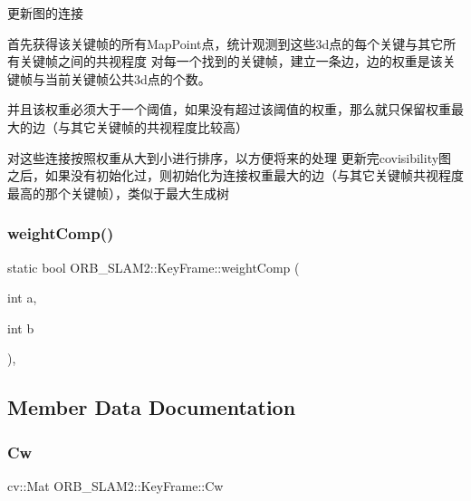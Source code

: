 更新图的连接 


\begin{DoxyEnumerate}
\item 首先获得该关键帧的所有\+Map\+Point点，统计观测到这些3d点的每个关键与其它所有关键帧之间的共视程度 对每一个找到的关键帧，建立一条边，边的权重是该关键帧与当前关键帧公共3d点的个数。
\item 并且该权重必须大于一个阈值，如果没有超过该阈值的权重，那么就只保留权重最大的边（与其它关键帧的共视程度比较高）
\item 对这些连接按照权重从大到小进行排序，以方便将来的处理 更新完covisibility图之后，如果没有初始化过，则初始化为连接权重最大的边（与其它关键帧共视程度最高的那个关键帧），类似于最大生成树 
\end{DoxyEnumerate}\mbox{\label{class_o_r_b___s_l_a_m2_1_1_key_frame_ad2d0287d1ca4a91cd9d684754c84a08b}} 
\subsubsection{\texorpdfstring{weight\+Comp()}{weightComp()}}
{\footnotesize\ttfamily static bool O\+R\+B\+\_\+\+S\+L\+A\+M2\+::\+Key\+Frame\+::weight\+Comp (\begin{DoxyParamCaption}\item[{int}]{a,  }\item[{int}]{b }\end{DoxyParamCaption})\hspace{0.3cm}{\ttfamily [inline]}, {\ttfamily [static]}}



\subsection{Member Data Documentation}
\mbox{\label{class_o_r_b___s_l_a_m2_1_1_key_frame_a4666bde848e4fbabf327e5ec0804e80e}} 
\subsubsection{\texorpdfstring{Cw}{Cw}}
{\footnotesize\ttfamily cv\+::\+Mat O\+R\+B\+\_\+\+S\+L\+A\+M2\+::\+Key\+Frame\+::\+Cw\hspace{0.3cm}{\ttfamily [protected]}}

